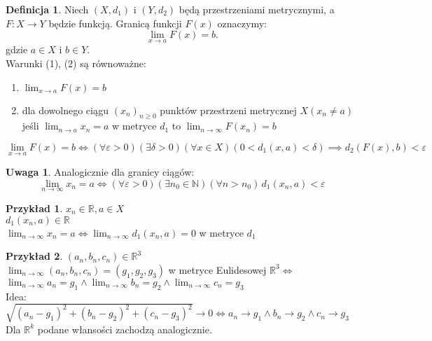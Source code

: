 \documentclass{article}
\theoremstyle{definition}
\newtheorem{de}{Definicja}[subsection]
\theoremstyle{definition}
\theoremstyle{definition}
\newtheorem{pk}{Przykład}[subsection]
\theoremstyle{definition}
\theoremstyle{definition}
\theoremstyle{definition}
\newtheorem*{uw}{Uwaga}
\theoremstyle{definition}
\begin{document}
\begin{de}
    Niech $(X,d_1)$ i $(Y, d_2)$ będą przestrzeniami metrycznymi, a $F: X \rightarrow Y$ będzie funkcją. 
    Granicą funkcji $F(x)$ oznaczymy:
    \[ 
    \lim_{x \rightarrow a} F(x) = b.
    \]
    gdzie $a \in X$ i $b \in Y$.\\
    Warunki (1), (2) są równoważne:
    \begin{enumerate}
        \item $\lim_{x\rightarrow a} F(x) = b$
        \item dla dowolnego ciągu $(x_n)_{n\geq 0}$ 
        punktów przestrzeni metrycznej $X(x_n \neq a)$\\
        jeśli $\lim_{n\rightarrow a} x_n = a$ w metryce $d_1$ to
        $\lim_{n\rightarrow \infty} F(x_n) = b$
    \end{enumerate}
    \[ \lim_{x \rightarrow a} F(x) = b \iff (\forall \varepsilon > 0) (\exists \delta > 0) (\forall x \in X) (0 < d_1(x,a) < \delta) \implies d_2(F(x),b) < \varepsilon \]
\end{de}

\begin{uw}
    Analogicznie dla granicy ciągów:
    \[
    \lim_{n \to \infty} x_n = a \iff (\forall \varepsilon > 0) (\exists n_0 \in \mathbb{N}) (\forall n > n_0) \, d_1(x_n,a) < \varepsilon
    \]
\end{uw}

\begin{pk}
    $x_n\in\mathbb{R}, a\in X$\\
    $d_1(x_n,a) \in \mathbb{R}$\\
    $\lim_{n\rightarrow \infty} x_n = a \iff \lim_{n\rightarrow\infty} d_1(x_n,a)=0$ w metryce $d_1$
\end{pk}

\begin{pk}
    $(a_n,b_n,c_n) \in \mathbb{R}^3$\\
    $\lim_{n\rightarrow \infty} (a_n,b_n,c_n) = (g_1,g_2,g_3)$ w metryce Eulidesowej $\mathbb{R}^3 \iff$\\
    $\lim_{n\rightarrow \infty} a_n = g_1 \land \lim_{n\rightarrow \infty} b_n = g_2 \land \lim_{n\rightarrow \infty} c_n = g_3$\\
    Idea:\\
    $\sqrt{(a_n-g_1)^2 + (b_n-g_2)^2 + (c_n-g_3)^2}\rightarrow 0 \iff a_n\rightarrow g_1 \land b_n \rightarrow g_2 \land c_n \rightarrow g_3$\\
    Dla $\mathbb{R}^k$ podane włansości zachodzą analogicznie.
\end{pk}
\end{document}

